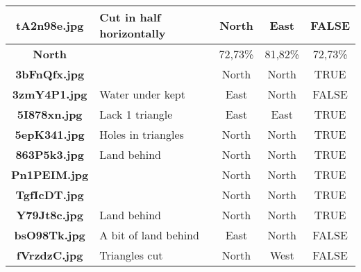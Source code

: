 \documentclass{article}
\begin{document}
\begin{table}[h!]
{\begin{tabular}{|c|p{4cm}|c|c|c|}
            \textbf{tA2n98e.jpg} & Cut in half horizontally     & North                         & East                             & FALSE                \\ \hline
            \rowcolor{gray!40}
            \textbf{North}       &                              & 72,73\%                       & 81,82\%                          & 72,73\%              \\ \hline
            \rowcolor{gray!0}
            \textbf{3bFnQfx.jpg} &                              & North                         & North                            & TRUE                 \\ \hline
            \rowcolor{gray!10}
            \textbf{3zmY4P1.jpg} & Water under kept             & East                          & North                            & FALSE                \\ \hline
            \rowcolor{gray!0}
            \textbf{5I878xn.jpg} & Lack 1 triangle              & East                          & East                             & TRUE                 \\ \hline
            \rowcolor{gray!10}
            \textbf{5epK341.jpg} & Holes in triangles           & North                         & North                            & TRUE                 \\ \hline
            \rowcolor{gray!0}
            \textbf{863P5k3.jpg} & Land behind                  & North                         & North                            & TRUE                 \\ \hline
            \rowcolor{gray!10}
            \textbf{Pn1PEIM.jpg} &                              & North                         & North                            & TRUE                 \\ \hline
            \rowcolor{gray!0}
            \textbf{TgfIcDT.jpg} &                              & North                         & North                            & TRUE                 \\ \hline
            \rowcolor{gray!10}
            \textbf{Y79Jt8c.jpg} & Land behind                  & North                         & North                            & TRUE                 \\ \hline
            \rowcolor{gray!0}
            \textbf{bsO98Tk.jpg} & A bit of land behind         & East                          & North                            & FALSE                \\ \hline
            \rowcolor{gray!10}
            \textbf{fVrzdzC.jpg} & Triangles cut                & North                         & West                             & FALSE                \\ \hline

\end{tabular}}
\end{table}
\end{document}
